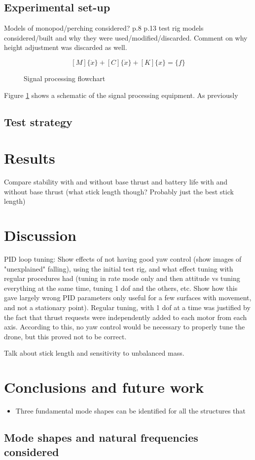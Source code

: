 \documentclass[12pt,a4paper,oneside]{article}
\begin{document}
\subsection{Experimental set-up}
Models of monopod/perching considered? p.8
p.13 test rig models considered/built and why they were used/modified/discarded. Comment on why height adjustment was discarded as well.


\begin{equation} \label{eq1}
[M]\{\ddot{x}\}+[C]\{\dot{x}\}+[K]\{x\} = \{f\}
\end{equation}

\begin{figure}[h!]
\centering
  \caption{Signal processing flowchart}
  \label{fig1}
\end{figure}
Figure \ref{fig1} shows a schematic of the signal processing equipment. As previously \subsection{Test strategy}

\section{Results} \label{results}
Compare stability with and without base thrust and battery life with and without base thrust (what stick length though? Probably just the best stick length)

\section{Discussion}
PID loop tuning: Show effects of not having good yaw control (show images of "unexplained" falling), using the initial test rig, and what effect tuning with regular procedures had (tuning in rate mode only and then attitude vs tuning everything at the same time, tuning 1 dof and the others, etc. Show how this gave largely wrong PID parameters only useful for a few surfaces with movement, and not a stationary point). Regular tuning, with 1 dof at a time was justified by the fact that thrust requests were independently added to each motor from each axis. According to this, no yaw control would be necessary to properly tune the drone, but this proved not to be correct.

Talk about stick length and sensitivity to unbalanced mass.
\section{Conclusions and future work}
\begin{itemize}
\item Three fundamental mode shapes can be identified for all the structures that \end{itemize}





\pagebreak
\begin{appendices}
\section{Mode shapes and natural frequencies considered}

\end{appendices}
\end{document}
